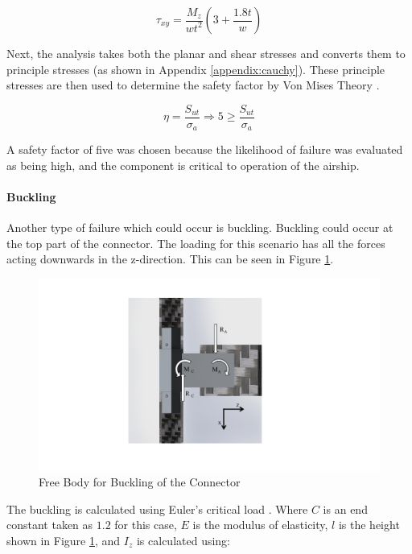 \documentclass[../main.tex]{subfiles}
\begin{document}
\begin{equation} \label{eqn:armtorsionShear}
\tau_{xy} = \dfrac{M_{z}}{wt^2}(3+\frac{1.8t}{w})
\end{equation}

Next, the analysis takes both the planar and shear stresses and converts them to principle stresses (as shown in Appendix \ref{appendix:cauchy}). These principle stresses are then used to determine the safety factor by Von Mises Theory \cite[221]{shigley}.

\begin{equation}
\eta = \dfrac{S_{ut}}{\sigma _a} \Rightarrow 5 \geq \dfrac{S_{ut}}{\sigma _a}
\end{equation}

A safety factor of five was chosen because the likelihood of failure was evaluated as being high, and the component is critical to operation of the airship.

\paragraph*{Buckling}

Another type of failure which could occur is buckling. Buckling could occur at the top part of the connector. The loading for this scenario has all the forces acting downwards in the z-direction. This can be seen in Figure \ref{fig:armConnectorBuck}.

\begin{figure}[H]
	\centering
	\includegraphics[page={2}, width=.8\linewidth]{img/analysis/arm/armConnector.pdf}
	\caption{Free Body for Buckling of the Connector}
	\label{fig:armConnectorBuck}
\end{figure}

The buckling is calculated using Euler's critical load \cite[178]{shigley}. Where $C$ is an end constant taken as $1.2$ for this case, $E$ is the modulus of elasticity, $l$ is the height shown in Figure \ref{fig:armConnectorBuck}, and $I_z$ is calculated using: 
\end{document}
